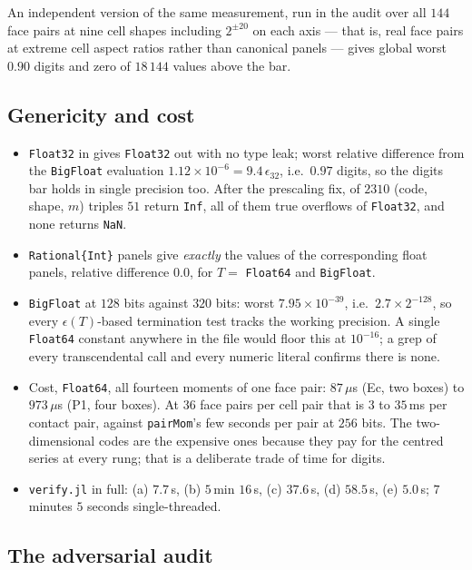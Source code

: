 \documentclass[11pt]{article}
\theoremstyle{remark}
\newcommand{\code}[1]{\texttt{#1}}
\begin{document}
An independent version of the same measurement, run in the audit over all $144$ face pairs
at nine cell shapes including $2^{\pm20}$ on each axis --- that is, real face pairs at
extreme cell aspect ratios rather than canonical panels --- gives global worst $0.90$
digits and zero of $18\,144$ values above the bar.

\subsection{Genericity and cost}

\begin{itemize}[nosep]
\item \code{Float32} in gives \code{Float32} out with no type leak; worst relative
difference from the \code{BigFloat} evaluation $1.12\times10^{-6} = 9.4\,\epsilon_{32}$,
i.e.\ $0.97$ digits, so the digits bar holds in single precision too. After the
prescaling fix, of $2310$ (code, shape, $m$) triples $51$ return \code{Inf}, all of them
true overflows of \code{Float32}, and none returns \code{NaN}.
\item \code{Rational\{Int\}} panels give \emph{exactly} the values of the corresponding
float panels, relative difference $0.0$, for $T = $ \code{Float64} and \code{BigFloat}.
\item \code{BigFloat} at $128$ bits against $320$ bits: worst $7.95\times10^{-39}$,
i.e.\ $2.7\times2^{-128}$, so every $\epsilon(T)$-based termination test tracks the working
precision. A single \code{Float64} constant anywhere in the file would floor this at
$10^{-16}$; a grep of every transcendental call and every numeric literal confirms there is
none.
\item Cost, \code{Float64}, all fourteen moments of one face pair: $87\,\mu$s (Ec, two
boxes) to $973\,\mu$s (P1, four boxes). At $36$ face pairs per cell pair that is $3$ to
$35$\,ms per contact pair, against \code{pairMom}'s few seconds per pair at $256$ bits.
The two-dimensional codes are the expensive ones because they pay for the centred series
at every rung; that is a deliberate trade of time for digits.
\item \code{verify.jl} in full: (a) $7.7$\,s, (b) $5$\,min $16$\,s, (c) $37.6$\,s,
(d) $58.5$\,s, (e) $5.0$\,s; $7$ minutes $5$ seconds single-threaded.
\end{itemize}

\subsection{The adversarial audit}
\label{sec:audit}
\end{document}
